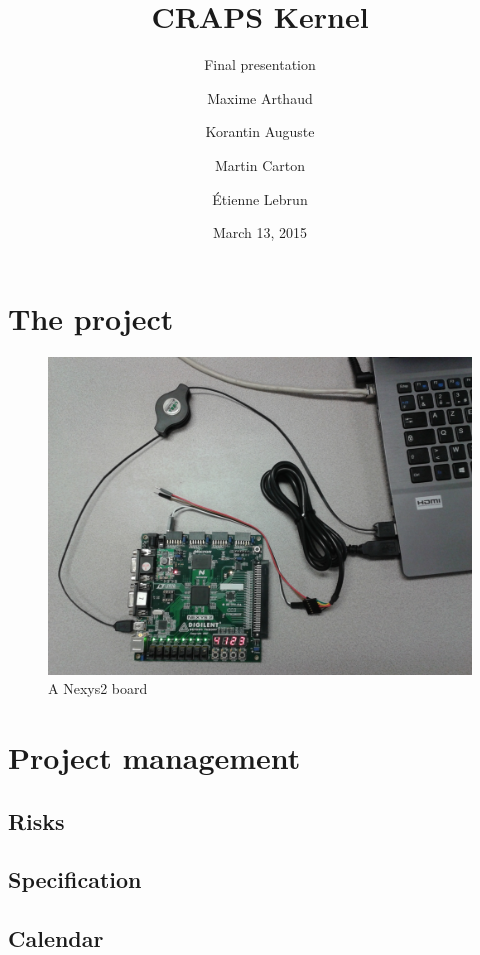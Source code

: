 \documentclass{beamer}
\title{CRAPS Kernel}
\subtitle{Final presentation}
\author{
       Maxime Arthaud
  \and Korantin Auguste
  \and Martin Carton
  \and Étienne Lebrun
}
\date{March 13, 2015}
\begin{document}
  \begin{frame}
    \titlepage%
  \end{frame}

  \section{The project}

    \begin{frame}
      \begin{figure}
        \centering
        \includegraphics[width=\textwidth, keepaspectratio]{fig/Nexys2.jpg}
        \caption{A Nexys2 board}
      \end{figure}
    \end{frame}

  \section{Project management}

    \subsection{Risks}

    \subsection{Specification}

    \subsection{Calendar}
\end{document}
